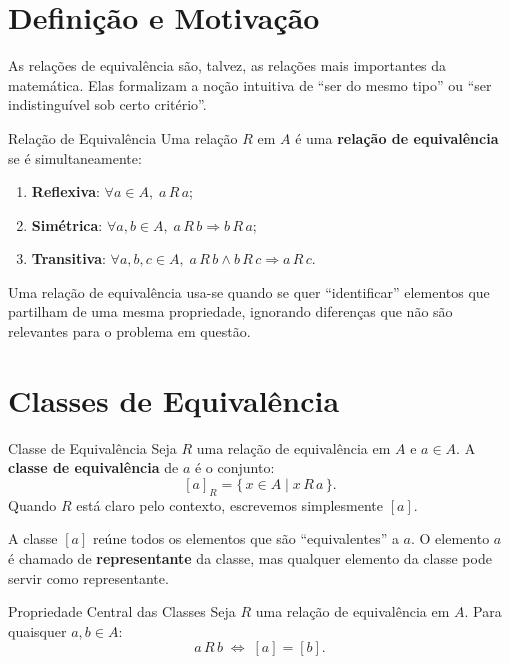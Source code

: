 \documentclass[12pt,a4paper]{book}
\begin{document}
\section{Definição e Motivação}

As relações de equivalência são, talvez, as relações mais importantes da matemática. Elas formalizam a noção intuitiva de ``ser do mesmo tipo'' ou ``ser indistinguível sob certo critério''.

\begin{definicao}{Relação de Equivalência}{}
Uma relação $R$ em $A$ é uma \textbf{relação de equivalência} se é simultaneamente:
\begin{enumerate}[label=(\roman*)]
  \item \textbf{Reflexiva}: $\forall a \in A,\; a\,R\,a$;
  \item \textbf{Simétrica}: $\forall a,b \in A,\; a\,R\,b \Rightarrow b\,R\,a$;
  \item \textbf{Transitiva}: $\forall a,b,c \in A,\; a\,R\,b \land b\,R\,c \Rightarrow a\,R\,c$.
\end{enumerate}
\end{definicao}

Uma relação de equivalência usa-se quando se quer ``identificar'' elementos que partilham de uma mesma propriedade, ignorando diferenças que não são relevantes para o problema em questão.

\section{Classes de Equivalência}

\begin{definicao}{Classe de Equivalência}{}
Seja $R$ uma relação de equivalência em $A$ e $a \in A$. A \textbf{classe de equivalência} de $a$ é o conjunto:
\[
  [a]_R = \{\,x \in A \mid x\,R\,a\,\}.
\]
Quando $R$ está claro pelo contexto, escrevemos simplesmente $[a]$.
\end{definicao}

A classe $[a]$ reúne todos os elementos que são ``equivalentes'' a $a$. O elemento $a$ é chamado de \textbf{representante} da classe, mas qualquer elemento da classe pode servir como representante.

\begin{proposicao}{Propriedade Central das Classes}{}
Seja $R$ uma relação de equivalência em $A$. Para quaisquer $a, b \in A$:
\[
  a\,R\,b \;\Longleftrightarrow\; [a] = [b].
\]
\end{proposicao}
\end{document}
